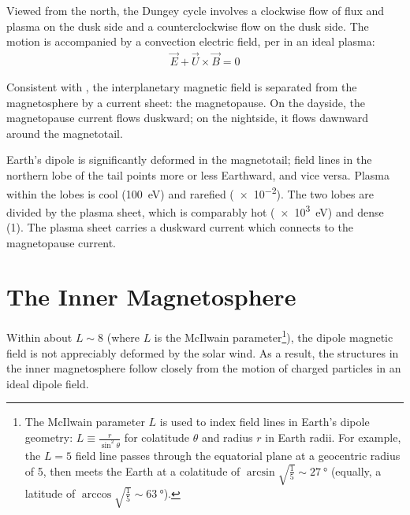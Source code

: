 Viewed from the north, the Dungey cycle involves a clockwise flow of flux and plasma on the dusk side and a counterclockwise flow on the dusk side. The motion is accompanied by a convection electric field, per \ohmlaw in an ideal plasma:
\begin{align}
  \vec{E} + \vec{U} \times \vec{B} = 0
\end{align}



Consistent with \amplaw, the interplanetary magnetic field is separated from the magnetosphere by a current sheet: the magnetopause. On the dayside, the magnetopause current flows duskward; on the nightside, it flows dawnward around the magnetotail. 

Earth's dipole is significantly deformed in the magnetotail; field lines in the northern lobe of the tail points more or less Earthward, and vice versa. Plasma within the lobes is cool (\about\SI{100}{\eV}) and rarefied (\about\SI{e-2}{\percc}). The two lobes are divided by the plasma sheet, which is comparably hot (\about\SI{e3}{\eV}) and dense (\about\SI{1}{\percc}). The plasma sheet carries a duskward current which connects to the magnetopause current. 

\section{The Inner Magnetosphere}

Within about $L \sim 8$ (where $L$ is the McIlwain parameter\footnote{The McIlwain parameter $L$ is used to index field lines in Earth's dipole geometry: $L \equiv \frac{r}{\sin^2\theta}$ for colatitude $\theta$ and radius $r$ in Earth radii. For example, the $L=5$ field line passes through the equatorial plane at a geocentric radius of \SI{5}{\RE}, then meets the Earth at a colatitude of $\arcsin \sqrt{ \frac{1}{5} } \sim \SI{27}{\degree}$ (equally, a latitude of $\arccos \sqrt{ \frac{1}{5} } \sim \SI{63}{\degree}$). }), the dipole magnetic field is not appreciably deformed by the solar wind. As a result, the structures in the inner magnetosphere follow closely from the motion of charged particles in an ideal dipole field. 

